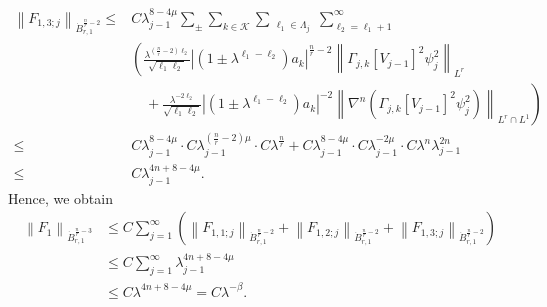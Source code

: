 \documentclass[a4paper,12pt,reqno]{amsart}
\theoremstyle{plain}
\theoremstyle{definition}
\newcommand{\dB}{\dot{B}}
\renewcommand{\leq}{\leqslant}
\newcommand{\n}[1]{{\left\|#1\right\|}}
\renewcommand{\sp}[1]{\left(#1\right)}
\begin{document}
\begin{align}
    \n{F_{1,3;j}}_{\dB_{r,1}^{\frac{n}{r}-2}}
    \leq
    {}&
    C
    \lambda_{j-1}^{8-4\mu}
    \sum_{\pm}
    \sum_{k \in \mathcal{K}}
    \sum_{\substack{\ell_1 \in \Lambda_j}}
    \sum_{\ell_2=\ell_1+1}^{\infty}
    \\
    &
    \left ( \frac{\lambda^{(\frac{n}{r}-2)\ell_2}}{\sqrt{\ell_1\ell_2}}
    |(1\pm \lambda^{\ell_1-\ell_2})a_k|^{\frac{n}{r}-2}
    \n{\Gamma_{j,k}[V_{j-1}]^2
    \psi_{j}^2}_{L^r} \right. 
    \\
    & 
    \left. 
    \quad
    +
    \frac{\lambda^{-2\ell_2}}{\sqrt{\ell_1\ell_2}}
    |(1\pm \lambda^{\ell_1-\ell_2})a_k|^{-2}
    \n{\nabla^n(\Gamma_{j,k}[V_{j-1}]^2
    \psi_{j}^2)}_{L^r\cap L^1} \right)
    \\
    \leq{}& 
    C
    \lambda_{j-1}^{8-4\mu}\cdot C\lambda_{j-1}^{(\frac{n}{r}-2)\mu}\cdot C\lambda^{\frac{n}{r}}
    +
    C\lambda_{j-1}^{8-4\mu}\cdot C\lambda_{j-1}^{-2\mu}\cdot C\lambda^n\lambda_{j-1}^{2n}
    \\
    \leq{}& 
    C\lambda_{j-1}^{4n+8-4\mu}.
\end{align}
Hence, we obtain 
\begin{align}
    \n{F_{1}}_{\dB_{r,1}^{\frac{n}{r}-3}}
    &
    \leq
    C
    \sum_{j=1}^{\infty}
    \sp{
    \n{F_{1,1;j}}_{\dB_{r,1}^{\frac{n}{r}-2}}
    +
    \n{F_{1,2;j}}_{\dB_{r,1}^{\frac{n}{r}-2}}
    +
    \n{F_{1,3;j}}_{\dB_{r,1}^{\frac{n}{r}-2}}
    }
    \\
    &
    \leq
    C\sum_{j=1}^{\infty}
    \lambda_{j-1}^{4n+8-4\mu}
    \\
    &
    \leq{}
    C\lambda^{4n+8-4\mu}
    =
    C\lambda^{-\beta}.
    \label{est:F1}
\end{align}
\end{document}
